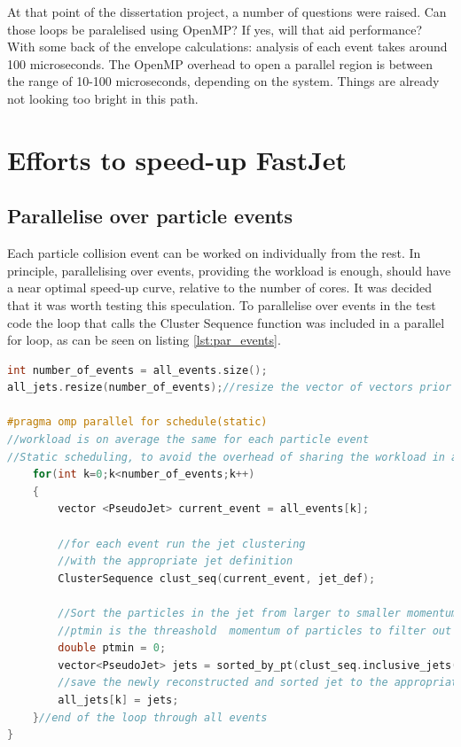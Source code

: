 

At that point of the dissertation project, a number of questions were raised. Can those loops be paralelised using OpenMP? If yes, will that aid performance? With some back of the envelope calculations: analysis of each event takes around 100 microseconds. The OpenMP overhead to open a parallel region is between the range of 10-100 microseconds, depending on the system. Things are already not looking too bright in this path.

\section{Efforts to speed-up FastJet}

\subsection{Parallelise over particle events}
Each particle collision event can be worked on individually from the rest. In principle, parallelising over events, providing the workload is enough, should have a near optimal speed-up curve, relative to the number of cores. It was decided that it was worth testing this speculation. To parallelise over events in the test code the loop that calls the Cluster Sequence function was included in a parallel for loop, as can be seen on listing \ref{lst:par_events}.

\begin{lstlisting}[language=c++,caption=Code fraction that parallelised over events,label=lst:par_events,escapechar=|]
int number_of_events = all_events.size();
all_jets.resize(number_of_events);//resize the vector of vectors prior to the loop, so that the reconstructed jets will be placed in the same position as in the serial program.

#pragma omp parallel for schedule(static)
//workload is on average the same for each particle event
//Static scheduling, to avoid the overhead of sharing the workload in an other way
    for(int k=0;k<number_of_events;k++)
    {
        vector <PseudoJet> current_event = all_events[k];

        //for each event run the jet clustering 
        //with the appropriate jet definition        
        ClusterSequence clust_seq(current_event, jet_def);

        //Sort the particles in the jet from larger to smaller momentum.
        //ptmin is the threashold  momentum of particles to filter out of the jet.
        double ptmin = 0;
        vector<PseudoJet> jets = sorted_by_pt(clust_seq.inclusive_jets(ptmin));
        //save the newly reconstructed and sorted jet to the appropriate position fo the vector of vectors
        all_jets[k] = jets;
    }//end of the loop through all events
}
\end{lstlisting}

